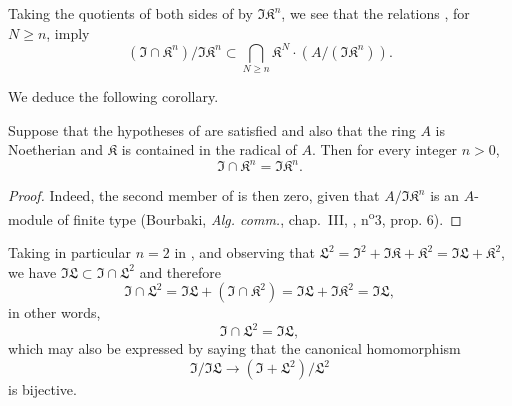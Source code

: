 Taking the quotients of both sides of  by $\mathfrak{I}\mathfrak{K}^{n}$, we see that the relations , for $N \geq n$, imply
\[
  \label{IV.16.9.13.4}
  (\mathfrak{I} \cap \mathfrak{K}^n)/\mathfrak{I}\mathfrak{K}^n \subset \bigcap_{N \geq n} \mathfrak{K}^N \cdot (A/(\mathfrak{I}\mathfrak{K}^n)).
  \tag{16.9.13.4}
\]

We deduce the following corollary.

\begin{corollary}[16.9.13.5]
\label{IV.16.9.13.5}
Suppose that the hypotheses of  are satisfied and also that the ring $A$ is Noetherian and $\mathfrak{K}$ is contained in the radical of $A$.
Then for every integer $n > 0$,
\[
  \label{IV.16.9.13.6}
  \mathfrak{I} \cap \mathfrak{K}^n = \mathfrak{I}\mathfrak{K}^n.
  \tag{16.9.13.6}
\]
\end{corollary}

\begin{proof}
Indeed, the second member of  is then zero, given that $A/\mathfrak{I}\mathfrak{K}^n$ is an $A$-module of finite type (Bourbaki, \emph{Alg. comm.}, chap.~III, , n\textsuperscript{o}3, prop. 6).
\end{proof}

Taking in particular $n = 2$ in , and observing that $\mathfrak{L}^2 = \mathfrak{I}^2 + \mathfrak{I}\mathfrak{K} + \mathfrak{K}^2 = \mathfrak{I}\mathfrak{L} + \mathfrak{K}^2$, we have $\mathfrak{I}\mathfrak{L} \subset \mathfrak{I} \cap \mathfrak{L}^2$ and therefore
\[
  \mathfrak{I} \cap \mathfrak{L}^2 = \mathfrak{I}\mathfrak{L} + (\mathfrak{I} \cap \mathfrak{K}^2) = \mathfrak{I}\mathfrak{L} + \mathfrak{I}\mathfrak{K}^2 = \mathfrak{I}\mathfrak{L},
\]
in other words, 
\[
  \label{IV.16.9.13.7}
  \mathfrak{I} \cap \mathfrak{L}^2 = \mathfrak{I}\mathfrak{L},
  \tag{16.9.13.7}
\]
which may also be expressed by saying that the canonical homomorphism
\[
  \mathfrak{I}/\mathfrak{I}\mathfrak{L} \to (\mathfrak{I} + \mathfrak{L}^2)/\mathfrak{L}^2
\]
is bijective.

